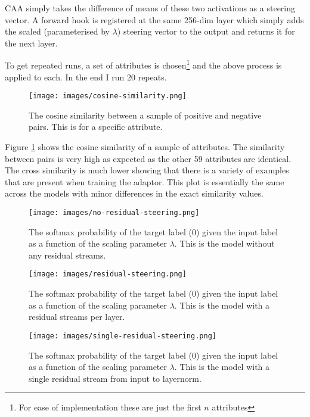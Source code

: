 \documentclass[]{article}
\begin{document}
CAA simply takes the difference of means of these two activations as a steering vector.
A forward hook is registered at the same 256-dim layer which simply adds the scaled (parameterised by $\lambda$) steering vector to the output and returns it for the next layer.

To get repeated runs, a set of attributes is chosen\footnote{For ease of implementation these are just the first $n$ attributes} and the above process is applied to each.
In the end I run 20 repeats.

\begin{figure}
    \centering
    \texttt{[image: images/cosine-similarity.png]}
    \caption{The cosine similarity between a sample of positive and negative pairs. This is for a specific attribute.}
    \label{fig:cosine-similarity}
\end{figure}

Figure \ref{fig:cosine-similarity} shows the cosine similarity of a sample of attributes.
The similarity between pairs is very high as expected as the other 59 attributes are identical.
The cross similarity is much lower showing that there is a variety of examples that are present when training the adaptor.
This plot is essentially the same across the models with minor differences in the exact similarity values.

\begin{figure}
    \centering
    \texttt{[image: images/no-residual-steering.png]}
    \caption{The softmax probability of the target label (0) given the input label as a function of the scaling parameter $\lambda$. This is the model without any residual streams.}
    \label{fig:nr-steering}
\end{figure}

\begin{figure}
    \centering
    \texttt{[image: images/residual-steering.png]}
    \caption{The softmax probability of the target label (0) given the input label as a function of the scaling parameter $\lambda$. This is the model with a residual streams per layer.}
    \label{fig:r-steering}
\end{figure}

\begin{figure}
    \centering
    \texttt{[image: images/single-residual-steering.png]}
    \caption{The softmax probability of the target label (0) given the input label as a function of the scaling parameter $\lambda$. This is the model with a single residual stream from input to layernorm.}
    \label{fig:sr-steering}
\end{figure}
\end{document}
